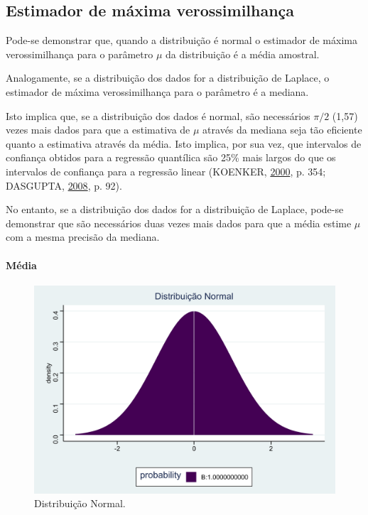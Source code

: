 \documentclass[a4paper, 12pt]{article}
\let\oldparagraph\paragraph
\renewcommand{\paragraph}[1]{\oldparagraph{#1}\mbox{}}
\begin{document}
\hypertarget{estimador-de-maxima-verossimilhanca}{%
\subsection{Estimador de máxima
verossimilhança}\label{estimador-de-maxima-verossimilhanca}}

Pode-se demonstrar que, quando a distribuição é normal o estimador de
máxima verossimilhança para o parâmetro \(\mu\) da distribuição é a
média amostral.

Analogamente, se a distribuição dos dados for a distribuição de Laplace,
o estimador de máxima verossimilhança para o parâmetro é a mediana.

Isto implica que, se a distribuição dos dados é normal, são necessários
\(\pi/2\) (1,57) vezes mais dados para que a estimativa de \(\mu\)
através da mediana seja tão eficiente quanto a estimativa através da
média. Isto implica, por sua vez, que intervalos de confiança obtidos
para a regressão quantílica são 25\% mais largos do que os intervalos de
confiança para a regressão linear (KOENKER,
\protect\hyperlink{ref-koenker2000}{2000}, p. 354; DASGUPTA,
\protect\hyperlink{ref-dasGupta}{2008}, p. 92).

No entanto, se a distribuição dos dados for a distribuição de Laplace,
pode-se demonstrar que são necessários duas vezes mais dados para que a
média estime \(\mu\) com a mesma precisão da mediana.

\hypertarget{media}{%
\paragraph{Média}\label{media}}

\begin{figure}[H]

{\centering \includegraphics[width=0.7\linewidth]{images/dist_normal-1} 

}

\caption{Distribuição Normal.}\label{fig:dist_normal}
\end{figure}
\end{document}
